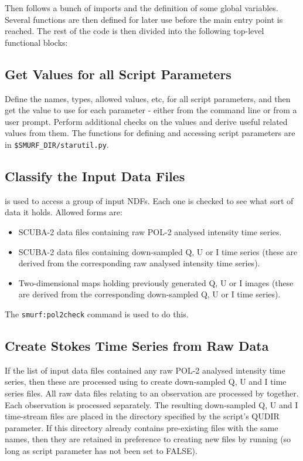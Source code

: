 \documentclass[twoside,11pt]{starlink}
\begin{document}
Then follows a bunch of imports and the definition of some global
variables. Several functions are then defined for later use before the
main entry point is reached. The rest of the code is then divided into the
following top-level functional blocks:

\subsection{Get Values for all Script Parameters}
Define the names, types, allowed values, etc, for all script
parameters, and then get the value to use for each parameter - either
from the command line or from a user prompt. Perform additional checks
on the values and derive useful related values from them. The functions
for defining and accessing script parameters are in
\texttt{\$SMURF\_DIR/starutil.py}.


\subsection{Classify the Input Data Files}  is used to
access a group of input NDFs. Each one is checked to see what sort of
data it holds. Allowed forms are:
\begin{itemize}
\item SCUBA-2 data files containing raw POL-2 analysed intensity time
series.
\item SCUBA-2 data files containing down-sampled Q, U or I time series
(these are derived from the corresponding raw analysed intensity time
series).
\item Two-dimensional maps holding previously generated Q, U or I images
(these are derived from the corresponding down-sampled Q, U or I time
series).
\end{itemize}
The \texttt{smurf:pol2check} command is used to do this.

\subsection{Create Stokes Time Series from Raw Data}
If the list of input data files contained any raw POL-2 analysed intensity
time series, then these are processed using \cqu to create
down-sampled Q, U and I time series files. All raw data files relating to
an observation are processed by \cqu together. Each
observation is processed separately. The resulting down-sampled Q, U and
I time-stream files are placed in the directory specified by the script's
QUDIR parameter. If this directory already contains pre-existing files
with the same names, then they are retained in preference to creating new
files by running \cqu (so long as  script
parameter has not been set to FALSE).
\end{document}
